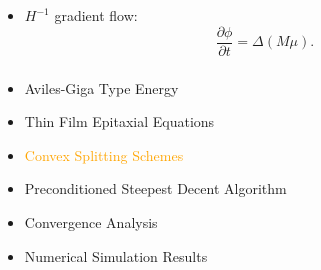 \documentclass[amstex]{beamer}
\newcommand{\wuhao}{\fontsize{10.5pt}{\baselineskip}\selectfont}    %
\begin{document}
\begin{CJK*}{GBK}{kai}
\begin{frame}
\begin{itemize}
\begin{itemize}
\item $H^{-1}$ gradient flow:
\begin{equation*}
\frac{\partial \phi}{\partial t}=\Delta(M \mu).
\end{equation*} 
\end{itemize}
\end{itemize}
\end{frame}
 \begin{frame}
 	\frametitle{\wuhao{\bf  Outline}}
 	\begin{itemize}%
 		\item \textcolor{orange!10}{Aviles-Giga Type Energy}
 		\item \textcolor{orange!10}{Thin Film Epitaxial Equations}
 		\item \textcolor{orange}{Convex Splitting Schemes}
 		\item \textcolor{orange!10}{Preconditioned Steepest Decent Algorithm}
 		\item \textcolor{orange!10}{Convergence Analysis}
 		\item \textcolor{orange!10}{Numerical Simulation Results}
 	\end{itemize}
 \end{frame}
 

\end{CJK*}
\end{document}
